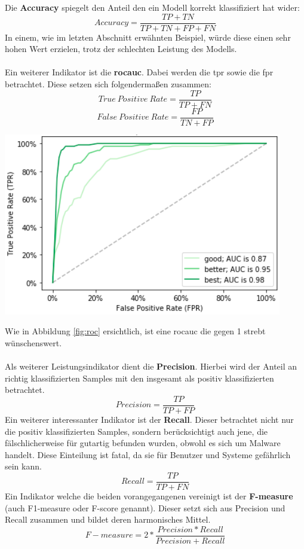 \documentclass[
    12pt, %
    DIV10,
    ngerman, %
    a4paper, %
    oneside, %
    titlepage, %
    parskip=half, %
    headings=normal, %
    listof=totoc, %
    bibliography=totoc, %
    index=totoc, %
    captions=tableheading, %
    final %
]{scrreprt}
\begin{document}
Die \textbf{Accuracy} spiegelt den Anteil den ein Modell korrekt klassifiziert hat wider:
$$Accuracy = \frac{TP + TN}{TP + TN + FP + FN}$$ In einem, wie im letzten Abschnitt erwähnten Beispiel, würde diese einen sehr hohen Wert erzielen, trotz der schlechten Leistung des Modells.
\\\\
Ein weiterer Indikator ist die \textbf{\ac{rocauc}}. Dabei werden die \ac{tpr} sowie die \ac{fpr} betrachtet. Diese setzen sich folgenderma{\ss}en zusammen:
$$True\ Positive\ Rate = \frac{TP}{TP + FN}$$
$$False\ Positive\ Rate = \frac{FP}{TN + FP}$$
\begin{center}
\includegraphics[scale=0.6]{img/roc.png}
\label{fig:roc}
\end{center}
Wie in Abbildung \ref{fig:roc} ersichtlich, ist eine \ac{rocauc} die gegen 1 strebt wünschenswert.
\\\\
Als weiterer Leistungsindikator dient die \textbf{Precision}. Hierbei wird der Anteil an richtig klassifizierten Samples mit den insgesamt als positiv klassifizierten betrachtet.
$$Precision = \frac{TP}{TP + FP}$$
Ein weiterer interessanter Indikator ist der \textbf{Recall}. Dieser betrachtet nicht nur die positiv klassifizierten Samples, sondern berücksichtigt auch jene, die fälschlicherweise für gutartig befunden wurden, obwohl es sich um Malware handelt. Diese Einteilung ist fatal, da sie für Benutzer und Systeme gefährlich sein kann.
$$Recall = \frac{TP}{TP + FN}$$
Ein Indikator welche die beiden vorangegangenen vereinigt ist der \textbf{F-measure} (auch F1-measure oder F-score genannt).
Dieser setzt sich aus Precision und Recall zusammen und bildet deren harmonisches Mittel.
$$F-measure = 2*\frac{Precision * Recall}{Precision + Recall}$$
\end{document}
